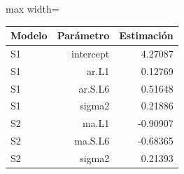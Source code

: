 \begin{center}\small\setlength{\tabcolsep}{4pt}
\begin{adjustbox}{max width=\textwidth}\begin{tabular}{lrr}
\toprule
Modelo & Parámetro & Estimación \\ \midrule
S1 & intercept & 4.27087 \\
S1 & ar.L1 & 0.12769 \\
S1 & ar.S.L6 & 0.51648 \\
S1 & sigma2 & 0.21886 \\
S2 & ma.L1 & -0.90907 \\
S2 & ma.S.L6 & -0.68365 \\
S2 & sigma2 & 0.21393 \\
\bottomrule\end{tabular}\end{adjustbox}\end{center}
